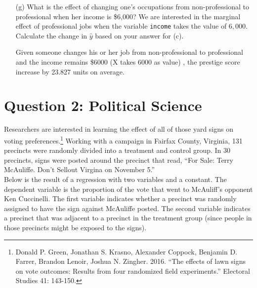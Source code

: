 \documentclass[12pt,letterpaper]{article}
\begin{document}
\begin{enumerate}
	
	\item [(g)]
	What is the effect of changing one's occupations from non-professional to professional when her income is \$6,000? We are interested in the marginal effect of professional jobs when the variable \texttt{income} takes the value of $6,000$. Calculate the change in $\hat{y}$ based on your answer for (c).
			  
	\noindent Given someone changes his or her job from non-professional to professional and the income remains \$6000 (X takes 6000 as value) , the prestige score increase by 23.827 units on average.
	\vspace{1cm}
	
	
\end{enumerate}

\newpage

\section*{Question 2: Political Science}
\vspace{.25cm}
\noindent 	Researchers are interested in learning the effect of all of those yard signs on voting preferences.\footnote{Donald P. Green, Jonathan	S. Krasno, Alexander Coppock, Benjamin D. Farrer,	Brandon Lenoir, Joshua N. Zingher. 2016. ``The effects of lawn signs on vote outcomes: Results from four randomized field experiments.'' Electoral Studies 41: 143-150. } Working with a campaign in Fairfax County, Virginia, 131 precincts were randomly divided into a treatment and control group. In 30 precincts, signs were posted around the precinct that read, ``For Sale: Terry McAuliffe. Don't Sellout Virgina on November 5.'' \\

Below is the result of a regression with two variables and a constant.  The dependent variable is the proportion of the vote that went to McAuliff's opponent Ken Cuccinelli. The first variable indicates whether a precinct was randomly assigned to have the sign against McAuliffe posted. The second variable indicates
a precinct that was adjacent to a precinct in the treatment group (since people in those precincts might be exposed to the signs).  \\
\end{document}
